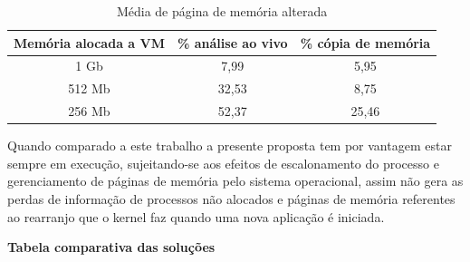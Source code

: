 \documentclass[
	12pt,				%
	openright,			%
	oneside,			%
	a4paper,			%
	english,			%
	french,				%
	spanish,			%
	brazil,				%
	]{abntex2}
\begin{document}
\begin{itemize}
\begin{table}[h!]
\centering
\caption{Média de página de memória alterada}
\label{my-label}
\begin{tabular}{c|c|c}
\hline
\textbf{Memória alocada a VM} & \textbf{\% análise ao vivo} 			  & \textbf{\% cópia de memória} \\ \hline
1 Gb                          & 7,99                                              & 5,95                         \\ \hline
512 Mb                        & 32,53                                             & 8,75                         \\ \hline
256 Mb                        & 52,37                                             & 25,46                                                         
\end{tabular}
\end{table}

Quando comparado a este trabalho a presente proposta tem por vantagem estar sempre em execução, sujeitando-se aos efeitos de escalonamento do processo e 
gerenciamento de páginas de memória pelo sistema operacional, assim não gera as perdas de informação de processos não alocados e páginas de memória referentes ao 
rearranjo que o kernel faz quando uma nova aplicação é iniciada.

\end{itemize}
 
\textbf{Tabela comparativa das soluções}
\end{document}
